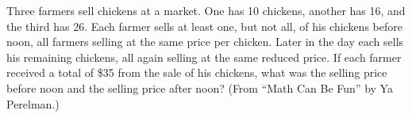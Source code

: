 Three farmers sell chickens at a market. One has 10 chickens, another has 16,
and the third has 26. Each farmer sells at least one, but not all, of his
chickens before noon, all farmers selling at the same price per chicken. Later
in the day each sells his remaining chickens, all again selling at the same
reduced price. If each farmer received a total of \$35 from the sale of his
chickens, what was the selling price before noon and the selling price after
noon? (From ``Math Can Be Fun'' by Ya Perelman.)
